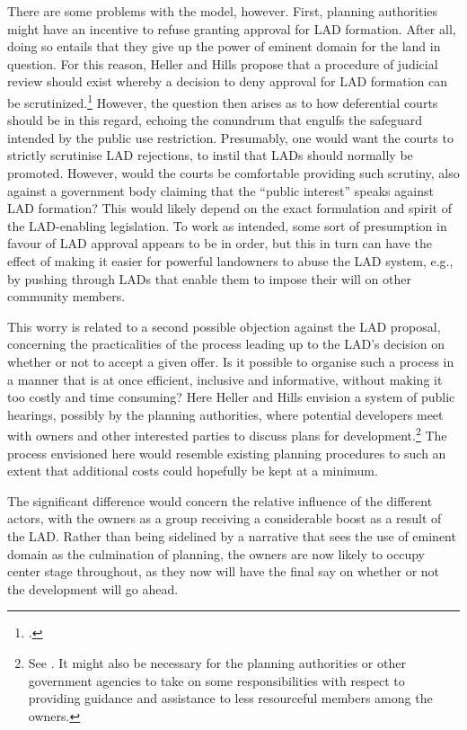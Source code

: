 There are some problems with the model, however. First, planning authorities might have an incentive to refuse granting approval for LAD formation. After all, doing so entails that they give up the power of eminent domain for the land in question. For this reason, Heller and Hills propose that a procedure of judicial review should exist whereby a decision to deny approval for LAD formation can be scrutinized.\footcite[1490]{heller08} However, the question then arises as to how deferential  courts should be in this regard, echoing the conundrum that engulfs the safeguard intended by the public use restriction. Presumably, one would want the courts to strictly scrutinise LAD rejections, to instil that LADs should normally be promoted. However, would the courts be comfortable providing such scrutiny, also against a government body claiming that the ``public interest'' speaks against LAD formation? This would likely depend on the exact formulation and spirit of the LAD-enabling legislation. To work as intended, some sort of presumption in favour of LAD approval appears to be in order, but this in turn can have the effect of making it easier for powerful landowners to abuse the LAD system, e.g., by pushing through LADs that enable them to impose their will on other community members.

This worry is related to a second possible objection against the LAD proposal, concerning the practicalities of the process leading up to the LAD's decision on whether or not to accept a given offer. Is it possible to organise such a process in a manner that is at once efficient, inclusive and informative, without making it too costly and time consuming? Here Heller and Hills envision a system of public hearings, possibly  by the planning authorities, where potential developers meet with owners and other interested parties to discuss plans for development.\footnote{See \cite[1490-1491]{heller08}. It might also be necessary for the planning authorities or other government agencies to take on some responsibilities with respect to providing guidance and assistance to less resourceful members among the owners.} The process envisioned here would resemble existing planning procedures to such an extent that additional costs could hopefully be kept at a minimum. 

The significant difference would concern the relative influence of the different actors, with the   owners as a group receiving a considerable boost as a result of the LAD. Rather than being sidelined by a narrative that sees the use of eminent domain as the culmination of planning, the owners are now likely to occupy center stage throughout, as they now will have the final say on whether or not the development will go ahead.

